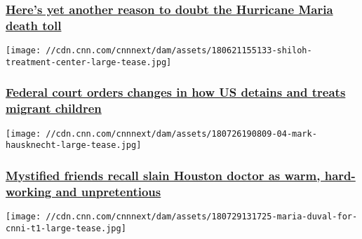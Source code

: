\hypertarget{heres-yet-another-reason-to-doubt-the-hurricane-maria-death-toll}{%
\subsubsection{\texorpdfstring{\href{/2018/08/02/health/jama-excess-death-hurricane-maria-invs/index.html}{Here's
yet another reason to doubt the Hurricane Maria death
toll}}{Here's yet another reason to doubt the Hurricane Maria death toll}}\label{heres-yet-another-reason-to-doubt-the-hurricane-maria-death-toll}}

\href{/2018/07/31/us/migrant-detention-center-court-ruling-invs/index.html}{}

\texttt{[image: //cdn.cnn.com/cnnnext/dam/assets/180621155133-shiloh-treatment-center-large-tease.jpg]}

\hypertarget{federal-court-orders-changes-in-how-us-detains-and-treats-migrant-children}{%
\subsubsection{\texorpdfstring{\href{/2018/07/31/us/migrant-detention-center-court-ruling-invs/index.html}{Federal
court orders changes in how US detains and treats migrant
children}}{Federal court orders changes in how US detains and treats migrant children}}\label{federal-court-orders-changes-in-how-us-detains-and-treats-migrant-children}}

\href{/2018/07/27/us/mark-hausknecht-houston-doctor-remembered-by-friends/index.html}{}

\texttt{[image: //cdn.cnn.com/cnnnext/dam/assets/180726190809-04-mark-hausknecht-large-tease.jpg]}

\hypertarget{mystified-friends-recall-slain-houston-doctor-as-warm-hard-working-and-unpretentious}{%
\subsubsection{\texorpdfstring{\href{/2018/07/27/us/mark-hausknecht-houston-doctor-remembered-by-friends/index.html}{Mystified
friends recall slain Houston doctor as warm, hard-working and
unpretentious}}{Mystified friends recall slain Houston doctor as warm, hard-working and unpretentious}}\label{mystified-friends-recall-slain-houston-doctor-as-warm-hard-working-and-unpretentious}}

\href{https://www.cnn.com/interactive/2018/07/investigates/maria-duval-psychic-scam-invs/index.html}{}

\texttt{[image: //cdn.cnn.com/cnnnext/dam/assets/180729131725-maria-duval-for-cnni-t1-large-tease.jpg]}

